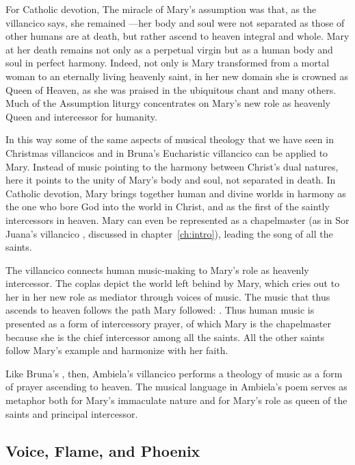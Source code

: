 For Catholic devotion, The miracle of Mary's assumption was that, as the villancico says, she remained ---her body and soul were not separated as those of other humans are at death, but rather ascend to heaven integral and whole.
Mary at her death remains  not only as a perpetual virgin but as a human body and soul in perfect harmony.
Indeed, not only is Mary transformed from a mortal woman to an eternally living heavenly saint, in her new domain she is crowned as Queen of Heaven, as she was praised in the ubiquitous  chant and many others.
Much of the Assumption liturgy concentrates on Mary's new role as heavenly Queen and intercessor for humanity.

In this way some of the same aspects of musical theology that we have seen in Christmas villancicos and in Bruna's Eucharistic villancico can be applied to Mary.
Instead of music pointing to the harmony between Christ's dual natures, here it points to the unity of Mary's body and soul, not separated in death.
In Catholic devotion, Mary brings together human and divine worlds in harmony as the one who bore God into the world in Christ, and as the first of the saintly intercessors in heaven.
Mary can even be represented as a chapelmaster (as in Sor Juana's villancico , discussed in chapter~\ref{ch:intro}), leading the song of all the saints.

The villancico connects human music-making to Mary's role as heavenly intercessor.
The coplas depict the world left behind by Mary, which cries out to her in her new role as mediator through voices of music.
The music that thus ascends to heaven follows the path Mary followed: .
Thus human music is presented as a form of intercessory prayer, of which Mary is the chapelmaster because she is the chief intercessor among all the saints.
All the other saints follow Mary's example and harmonize with her faith.

Like Bruna's , then, Ambiela's villancico performs a theology of music as a form of prayer ascending to heaven.
The musical language in Ambiela's poem serves as metaphor both for Mary's immaculate nature and for Mary's role as queen of the saints and principal intercessor.


\subsection{Voice, Flame, and Phoenix}

